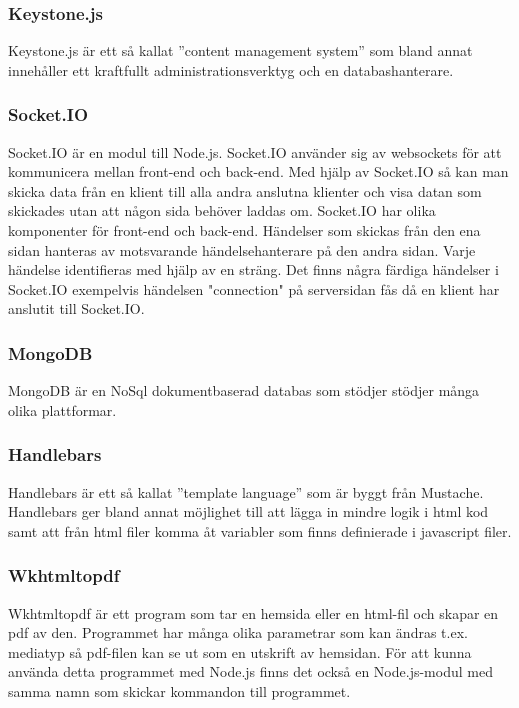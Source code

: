 \documentclass{article}
\begin{document}
\subsubsection{Keystone.js}
Keystone.js är ett så kallat ''content management system'' som bland annat innehåller ett kraftfullt administrationsverktyg och en databashanterare.

\subsubsection{Socket.IO}
Socket.IO är en modul till Node.js. Socket.IO använder sig av websockets för att kommunicera mellan front-end och back-end. Med hjälp av Socket.IO så kan man skicka data från en klient till alla andra anslutna klienter och visa datan som skickades utan att någon sida behöver laddas om.
Socket.IO har olika komponenter för front-end och back-end. Händelser som skickas från den ena sidan hanteras av motsvarande händelsehanterare på den andra sidan. Varje händelse identifieras med hjälp av en sträng. Det finns några färdiga händelser i Socket.IO exempelvis händelsen "connection" på serversidan fås då en klient har anslutit till Socket.IO.

\subsubsection{MongoDB}
MongoDB är en NoSql dokumentbaserad databas som stödjer stödjer många olika plattformar.

\subsubsection{Handlebars}
Handlebars är ett så kallat ''template language'' som är byggt från Mustache. Handlebars ger bland annat möjlighet till att lägga in mindre logik i html kod samt att från html filer komma åt variabler som finns definierade i javascript filer.

\subsubsection{Wkhtmltopdf}
Wkhtmltopdf är ett program som tar en hemsida eller en html-fil och skapar en pdf av den. Programmet har många olika parametrar som kan ändras t.ex. mediatyp så pdf-filen kan se ut som en utskrift av hemsidan. För att kunna använda detta programmet med Node.js finns det också en Node.js-modul med samma namn som skickar kommandon till programmet.
\end{document}
